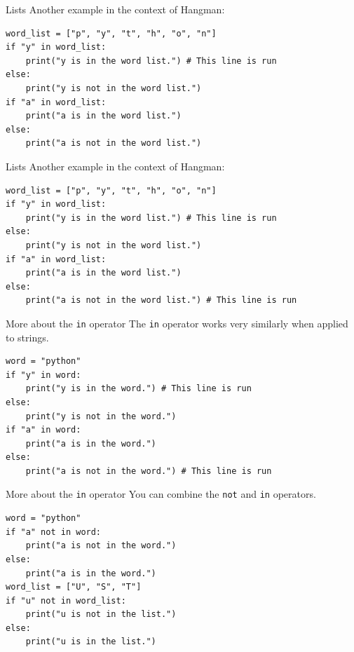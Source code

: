 \documentclass[dvipsnames, svgnames, x11names]{beamer}
\begin{document}
\addtocounter{framenumber}{-1}

\begin{frame}[fragile]{Lists}
Another example in the context of Hangman:
    
\begin{verbatim}
word_list = ["p", "y", "t", "h", "o", "n"]
if "y" in word_list:
    print("y is in the word list.") # This line is run
else:
    print("y is not in the word list.")
if "a" in word_list:
    print("a is in the word list.")
else:
    print("a is not in the word list.")
\end{verbatim}
\end{frame}

\addtocounter{framenumber}{-1}

\begin{frame}[fragile]{Lists}
Another example in the context of Hangman:
    
\begin{verbatim}
word_list = ["p", "y", "t", "h", "o", "n"]
if "y" in word_list:
    print("y is in the word list.") # This line is run
else:
    print("y is not in the word list.")
if "a" in word_list:
    print("a is in the word list.")
else:
    print("a is not in the word list.") # This line is run
\end{verbatim}
\end{frame}

\begin{frame}[fragile]{More about the \texttt{in} operator}
The \texttt{in} operator works very similarly when applied to strings.
\begin{verbatim}
word = "python"
if "y" in word:
    print("y is in the word.") # This line is run
else:
    print("y is not in the word.")
if "a" in word:
    print("a is in the word.")
else:
    print("a is not in the word.") # This line is run
\end{verbatim}
\end{frame}

\begin{frame}[fragile]{More about the \texttt{in} operator}
You can combine the \texttt{not} and \texttt{in} operators.
\begin{verbatim}
word = "python"
if "a" not in word:
    print("a is not in the word.")
else:
    print("a is in the word.")
word_list = ["U", "S", "T"]
if "u" not in word_list:
    print("u is not in the list.")
else:
    print("u is in the list.")
\end{verbatim}
\end{frame}
\end{document}
